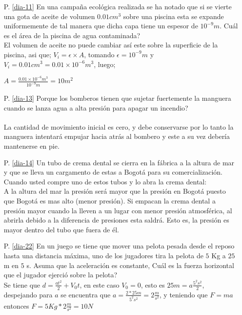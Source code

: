 \begin{itemize}

\item[P. \ref{dia-11}] En una campaña ecológica realizada se ha notado que si se vierte una gota de aceite de volumen $0.01cm^3$ sobre una piscina esta se expande uniformemente de tal manera que dicha capa tiene un espesor de $10^{-9}m$. Cuál es el área de la piscina de agua contaminada?\\
El volumen de aceite no puede cambiar así este sobre la superficie de la piscina, asi que;
$V_i=\epsilon \times A$, tomando $\epsilon=10^{-9}m$ y $V_i=0.01cm^3=0.01\times10^{-6}m^3$, luego;\\
\begin{center}
$A=\frac{0.01\times10^{-6}m^3}{10^{-9}m}=10m^2$
\end{center}



\item[P. \ref{dia-13}] Porque los bomberos tienen que sujetar fuertemente la manguera cuando se lanza agua a alta presión para apagar un incendio?\\ \\ La cantidad de movimiento inicial es cero, y debe conservarse por lo tanto la manguera intentará empujar hacia atrás al bombero y este a su vez debería mantenerse en pie.



\item[P. \ref{dia-14}] Un tubo de crema dental se cierra en la fábrica a la altura de mar y que se lleva un cargamento de estas a Bogotá para su comercialización. Cuando usted compre uno de estos tubos y lo abra la crema dental:\\
A la altura del mar la presión será mayor que la presión en Bogotá puesto que Bogotá es mas alto (menor presión). Si empacan la crema dental a presión mayor cuando la lleven a un lugar con menor presión atmosférica, al abrirla debido a la diferencia de presiones esta saldrá. Esto es, la presión es mayor dentro del tubo que fuera de él.



\item[P. \ref{dia-22}] En un juego se tiene que mover una pelota pesada desde el reposo hasta una distancia máxima, uno de los jugadores tira la pelota de $5$ Kg a $25$ m en $5$ s. Asuma que la aceleración es constante, Cuál es la fuerza horizontal que el jugador ejerció sobre la pelota?\\
Se tiene que $d=\frac{at^2}{2}+V_{0}t$, en este caso $V_0=0$, esto es $25m=a\frac{5^2 s^2}{2}$, despejando para $a$ se encuentra que $a=\frac{2*25m}{5^2 s^2}=2\frac{m}{s^2}$, y teniendo que $F=ma$ entonces $F=5Kg*2\frac{m}{s^2}=10N$



\end{itemize}

